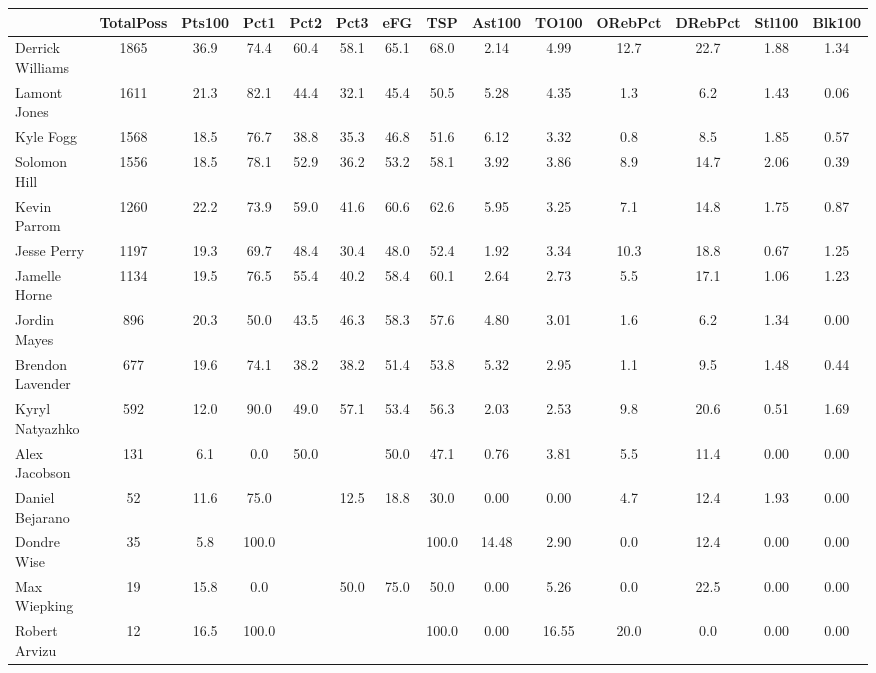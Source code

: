 \documentclass[10pt,letterpaper]{article}
\begin{document}
\begin{table}[ht]
\begin{center}
\begin{tabular}{lccccccccccccc}
  \hline
 & TotalPoss & Pts100 & Pct1 & Pct2 & Pct3 & eFG & TSP & Ast100 & TO100 & ORebPct & DRebPct & Stl100 & Blk100 \\ 
  \hline
Derrick Williams & 1865 & 36.9 & 74.4 & 60.4 & 58.1 & 65.1 & 68.0 & 2.14 & 4.99 & 12.7 & 22.7 & 1.88 & 1.34 \\ 
  Lamont Jones & 1611 & 21.3 & 82.1 & 44.4 & 32.1 & 45.4 & 50.5 & 5.28 & 4.35 & 1.3 & 6.2 & 1.43 & 0.06 \\ 
  Kyle Fogg & 1568 & 18.5 & 76.7 & 38.8 & 35.3 & 46.8 & 51.6 & 6.12 & 3.32 & 0.8 & 8.5 & 1.85 & 0.57 \\ 
  Solomon Hill & 1556 & 18.5 & 78.1 & 52.9 & 36.2 & 53.2 & 58.1 & 3.92 & 3.86 & 8.9 & 14.7 & 2.06 & 0.39 \\ 
  Kevin Parrom & 1260 & 22.2 & 73.9 & 59.0 & 41.6 & 60.6 & 62.6 & 5.95 & 3.25 & 7.1 & 14.8 & 1.75 & 0.87 \\ 
  Jesse Perry & 1197 & 19.3 & 69.7 & 48.4 & 30.4 & 48.0 & 52.4 & 1.92 & 3.34 & 10.3 & 18.8 & 0.67 & 1.25 \\ 
  Jamelle Horne & 1134 & 19.5 & 76.5 & 55.4 & 40.2 & 58.4 & 60.1 & 2.64 & 2.73 & 5.5 & 17.1 & 1.06 & 1.23 \\ 
  Jordin Mayes & 896 & 20.3 & 50.0 & 43.5 & 46.3 & 58.3 & 57.6 & 4.80 & 3.01 & 1.6 & 6.2 & 1.34 & 0.00 \\ 
  Brendon Lavender & 677 & 19.6 & 74.1 & 38.2 & 38.2 & 51.4 & 53.8 & 5.32 & 2.95 & 1.1 & 9.5 & 1.48 & 0.44 \\ 
  Kyryl Natyazhko & 592 & 12.0 & 90.0 & 49.0 & 57.1 & 53.4 & 56.3 & 2.03 & 2.53 & 9.8 & 20.6 & 0.51 & 1.69 \\ 
  Alex Jacobson & 131 & 6.1 & 0.0 & 50.0 &  & 50.0 & 47.1 & 0.76 & 3.81 & 5.5 & 11.4 & 0.00 & 0.00 \\ 
  Daniel Bejarano & 52 & 11.6 & 75.0 &  & 12.5 & 18.8 & 30.0 & 0.00 & 0.00 & 4.7 & 12.4 & 1.93 & 0.00 \\ 
  Dondre Wise & 35 & 5.8 & 100.0 &  &  &  & 100.0 & 14.48 & 2.90 & 0.0 & 12.4 & 0.00 & 0.00 \\ 
  Max Wiepking & 19 & 15.8 & 0.0 &  & 50.0 & 75.0 & 50.0 & 0.00 & 5.26 & 0.0 & 22.5 & 0.00 & 0.00 \\ 
  Robert Arvizu & 12 & 16.5 & 100.0 &  &  &  & 100.0 & 0.00 & 16.55 & 20.0 & 0.0 & 0.00 & 0.00 \\ 
   \hline
\end{tabular}
\end{center}
\end{table}
\end{document}
